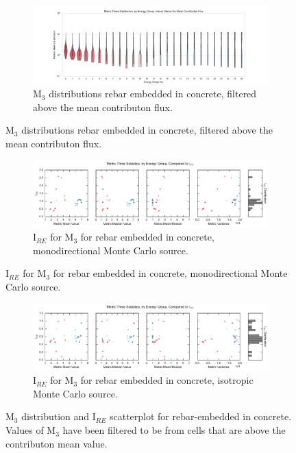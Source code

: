 \begin{figure}[htb!]
  \centering
  \begin{subfigure}[t]{\textwidth}
    \includegraphics[width=\linewidth]{./chapters/characterization_probs/figures/char/prob_4/metric_three_violin_mean.pdf}
    \caption{M$_3$ distributions rebar embedded in concrete, filtered above the
    mean contributon flux.}
    \label{fig:M3violinrebar}
  \end{subfigure}
\end{figure}
\begin{figure}[htb!]\ContinuedFloat
  \centering
  \begin{subfigure}[t]{\textwidth}
    \includegraphics[width=\linewidth]{./chapters/characterization_probs/figures/char/prob_4/metric_three_err_stats_mean.pdf}
    \caption{I$_{RE}$ for M$_3$ for rebar embedded in concrete, monodirectional
  Monte Carlo source.}
    \label{fig:M3statsrebar}
  \end{subfigure}
\end{figure}
\begin{figure}[htb!]\ContinuedFloat
  \centering
  \begin{subfigure}[t]{\textwidth}
    \includegraphics[width=\linewidth]{./chapters/characterization_probs/figures/char/prob_4_iso/metric_three_err_stats_mean.pdf}
    \caption{I$_{RE}$ for M$_3$ for rebar embedded in concrete, isotropic
  Monte Carlo source.}
    \label{fig:M3statsrebar}
  \end{subfigure}
  \caption[M$_3$ distribution and trends for rebar-embedded concrete
  problem.]{M$_3$ distribution and I$_{RE}$ scatterplot for rebar-embedded in
concrete. Values of M$_3$ have been filtered to be from cells that are above the
contributon mean value.}
  \label{fig:rebarplots}
\end{figure}

